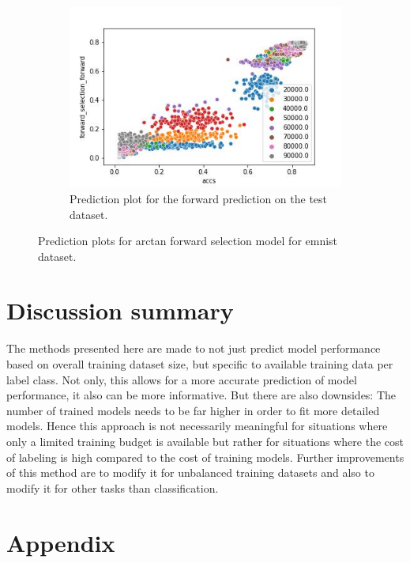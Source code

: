 \documentclass{article} %
\begin{document}
\begin{figure}
\begin{subfigure}{.33\textwidth}
        \includegraphics[width=.98\linewidth]{emnist/arctan_all_epochs_forward_selection_train.jpg}
        \caption{Prediction plot for the forward prediction on the test dataset.}
        \label{fig:emnist_prediction_plot_val}
    \end{subfigure}
    \caption{Prediction plots for arctan forward selection model for emnist dataset.}
    \label{fig:emnist_prediction_plot}
\end{figure}

\section{Discussion summary}

The methods presented here are made to not just predict model performance based on overall training dataset size, but specific to available training data per label class.
Not only, this allows for a more accurate prediction of model performance, it also can be more informative.
But there are also downsides: The number of trained models needs to be far higher in order to fit more detailed models.
Hence this approach is not necessarily meaningful for situations where only a limited training budget is available but rather for situations where the cost of labeling is high compared to the cost of training models.
Further improvements of this method are to modify it for unbalanced training datasets and also to modify it for other tasks than classification.

\pagebreak



\section*{Appendix}
\end{document}
